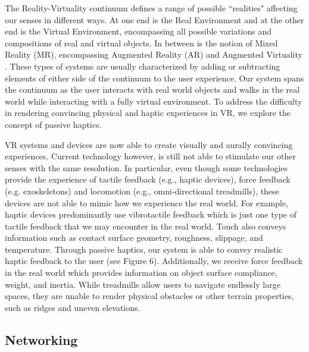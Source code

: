 \documentclass{sigchi}
\begin{document}
The Reality-Virtuality continuum \cite{wiki:reality-virtuality} defines a range of possible ``realities" affecting our senses in different ways.  At one end is the Real Environment and at the other end is the Virtual Environment, encompassing all possible variations and compositions of real and virtual objects. In between is the notion of Mixed Reality (MR), encompassing Augmented Reality (AR)  and Augmented Virtuality \cite{milgram1994taxonomy}. These types of systems are usually characterized by adding or subtracting elements of either side of the continuum to the user experience.  Our system spans the continuum as the user interacts with real world objects and walks in the real world while interacting with a fully virtual environment. To address the difficulty in rendering convincing physical and haptic experiences in VR, we explore the concept of passive haptics. 

VR systems and devices are now able to create visually and aurally convincing experiences. Current technology however, is still not able to stimulate our other senses with the same resolution. In particular, even though some technologies provide the experience of tactile feedback (e.g., haptic
devices), force feedback (e.g. exoskeletons) and locomotion (e.g., omni-directional treadmills), these devices are not able to mimic how we experience the real world. For example, haptic devices predominantly use vibrotactile feedback \cite{hale2014handbook} which is just one type of tactile feedback that we may encounter in the real world. Touch also conveys information such as contact surface geometry, roughness, slippage, and temperature. Through passive haptics, our system is able to convey realistic haptic feedback to the user (see Figure 6). Additionally, we receive force feedback \cite{bouzit2002rutgers} in the real world which provides information on object surface compliance, weight, and inertia. While treadmills allow users to navigate endlessly large spaces, they are unable to render physical obstacles or other terrain properties, such as ridges and uneven elevations. 

\subsection{Networking}
\end{document}
